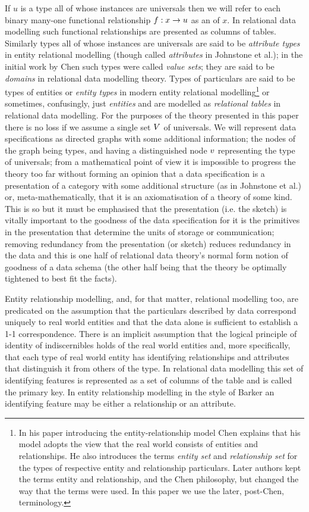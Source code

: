 If $u$ is a type all of whose instances are universals then we will refer to each binary many-one functional relationship $f: x \rightarrow u$ as an  of $x$. In relational data modelling such functional relationships are presented as columns of tables. Similarly types all of whose instances are universals  are said to be \textit{attribute types} in entity relational modelling  (though called \textit{attributes} in Johnstone et al.); in the initial work by Chen such types were called \textit{value sets}; they are said to be \textit{domains} in relational data modelling theory. Types of particulars are said to be types of entities or \textit{entity types} in modern entity relational modelling\footnote{In  his paper  introducing the entity-relationship model Chen explains that his model adopts the view that the real world consists of entities and relationships. He also introduces the  terms \textit{entity set} and \textit{relationship set} for the types of respective entity and relationship particulars. Later authors kept the terms entity and relationship, and the Chen philosophy, but changed the way that the terms were used. In this paper we use the later, post-Chen, terminology.} or sometimes, confusingly, just \textit{entities}  and are modelled as \textit{relational tables} in relational data modelling. For the purposes of the theory presented in this paper there is no loss if we assume a single set $V$ of universals.  We will represent data specifications as directed graphs with some additional information; the nodes of the graph being types, and having a distinguished node $v$ representing the type of universals; from a mathematical point of view it is impossible to progress the theory too far without forming an opinion that a data specification is a presentation of a category with some additional structure (as in Johnstone et al.) or, meta-mathematically, that it is an axiomatisation of a theory of some kind. This is so but it must be emphasised that the presentation (i.e. the sketch) is vitally important to the goodness of the data specification for it is the primitives in the presentation that determine the units of storage or communication; removing redundancy from the presentation (or sketch) reduces redundancy in the data and this is one half of relational data theory's  normal form notion of goodness of a data schema (the other half being that the theory be optimally tightened to best fit the facts).

Entity relationship modelling, and, for that matter, relational modelling too, are predicated on the assumption that the particulars described by data correspond uniquely to real world entities and that the data alone is sufficient to establish a 1-1 correspondence. There is an implicit assumption that the logical principle of identity of indiscernibles holds of the real world entities and, more specifically, that each type of real world entity has identifying relationships and attributes that distinguish it from  others of the type. In relational data modelling this set of identifying features is represented as a set of columns of the table and is called the primary key. In entity relationship modelling in the style of Barker an identifying feature may be either a relationship or an attribute.   


